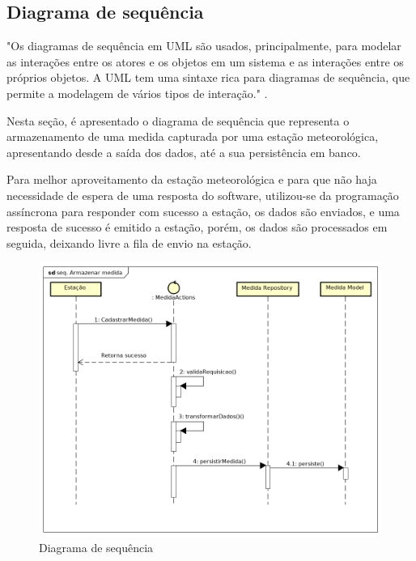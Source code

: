 \subsection{Diagrama de sequência}
\label{sec:diagrama_sequencia}

"Os diagramas de sequência em UML são usados, principalmente, para modelar as interações entre os atores e
os objetos em um sistema e as interações entre os próprios objetos. A UML tem uma sintaxe rica para diagramas
de sequência, que permite a modelagem de vários tipos de interação." \cite{engenharia_software_sommerville}.

Nesta seção, é apresentado o diagrama de sequência que representa o armazenamento de uma medida capturada por uma estação meteorológica, apresentando desde a saída dos dados, até a sua persistência em banco.

Para melhor aproveitamento da estação meteorológica e para que não haja necessidade de espera de uma resposta do software, utilizou-se da programação assíncrona para responder com sucesso a estação, os dados são enviados, e uma resposta de sucesso é emitido a estação, porém, os dados são processados em seguida, deixando livre a fila de envio na estação.

\begin{figure}[H]
    \centering
    \caption{Diagrama de sequência \label{fig:figure_diagrama_sequencia}}
    \includegraphics[scale=0.40]{diagrams/sequencia.png}
    \hfill
{}
\end{figure}

